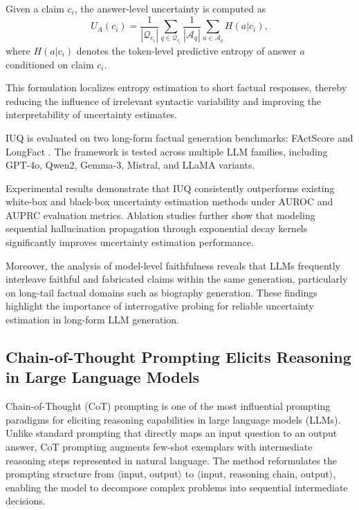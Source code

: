 Given a claim $c_i$, the answer-level uncertainty is computed as
\begin{equation}
U_A(c_i)=
\frac{1}{|\mathcal{Q}_{c_i}|}
\sum_{q\in\mathcal{Q}_{c_i}}
\frac{1}{|\mathcal{A}_q|}
\sum_{a\in\mathcal{A}_q}H(a|c_i),
\end{equation}
where $H(a|c_i)$ denotes the token-level predictive entropy of answer $a$ conditioned on claim $c_i$.

This formulation localizes entropy estimation to short factual responses, thereby reducing the influence of irrelevant syntactic variability and improving the interpretability of uncertainty estimates.


IUQ is evaluated on two long-form factual generation benchmarks: FActScore and LongFact . The framework is tested across multiple LLM families, including GPT-4o, Qwen2, Gemma-3, Mistral, and LLaMA variants.

Experimental results demonstrate that IUQ consistently outperforms existing white-box and black-box uncertainty estimation methods under AUROC and AUPRC evaluation metrics. Ablation studies further show that modeling sequential hallucination propagation through exponential decay kernels significantly improves uncertainty estimation performance.

Moreover, the analysis of model-level faithfulness reveals that LLMs frequently interleave faithful and fabricated claims within the same generation, particularly on long-tail factual domains such as biography generation. These findings highlight the importance of interrogative probing for reliable uncertainty estimation in long-form LLM generation.



\subsection{Chain-of-Thought Prompting Elicits Reasoning in Large Language Models}

Chain-of-Thought (CoT) prompting is one of the most influential prompting paradigms for eliciting reasoning capabilities in large language models (LLMs). Unlike standard prompting that directly maps an input question to an output answer, CoT prompting augments few-shot exemplars with intermediate reasoning steps represented in natural language. The method reformulates the prompting structure from $\langle$input, output$\rangle$ to $\langle$input, reasoning chain, output$\rangle$, enabling the model to decompose complex problems into sequential intermediate decisions.

